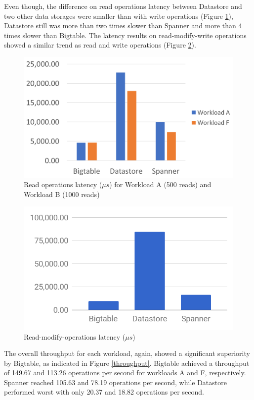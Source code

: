 \documentclass[bsc,frontabs,twoside,singlespacing,parskip,deptreport]{infthesis}     %
\begin{document}
Even though, the difference on read operations latency between Datastore and two other data storages were smaller than with write operations (Figure \ref{read-latency}), Datastore still was more than two times slower than Spanner and more than 4 times slower than Bigtable. The latency results on read-modify-write operations showed a similar trend as read and write operations (Figure \ref{read-modify-write-latency}). 

\begin{figure}[H]
	\centering
	\includegraphics[width=12cm]{read-latency}
	\caption{Read operations latency (\( \mu s\)) for Workload A (500 reads) and Workload B (1000 reads)}
	\label{read-latency}
\end{figure}

\begin{figure}[H]
	\centering
	\includegraphics[width=12cm]{read-modify-write-latency}
	\caption{Read-modify-operations latency (\( \mu s\))}
	\label{read-modify-write-latency}
\end{figure}

The overall throughput for each workload, again, showed a significant superiority by Bigtable, as indicated in Figure \ref{throughput}. Bigtable achieved a throughput of 149.67 and 113.26 operations per second for workloads A and F, respectively. Spanner reached 105.63 and 78.19 operations per second, while Datastore performed worst with only 20.37 and 18.82 operations per second.
\end{document}

